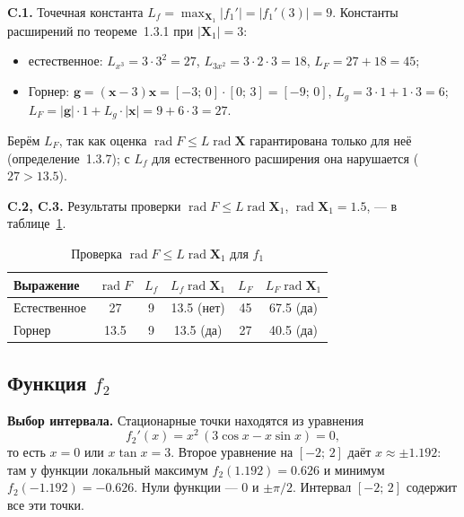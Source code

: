 \documentclass[a4paper, 14pt]{extarticle}
\begin{document}
\textbf{C.1.} Точечная константа $L_f = \max_{\mathbf{X}_1}|f_1'| = |f_1'(3)| = 9$. Константы расширений по теореме~1.3.1 при $|\mathbf{X}_1| = 3$:
\begin{itemize}
    \item естественное: $L_{x^3} = 3\cdot3^2 = 27$, $L_{3x^2} = 3\cdot2\cdot3 = 18$, $L_F = 27 + 18 = 45$;
    \item Горнер: $\mathbf{g} = (\mathbf{x} - 3)\mathbf{x} = [-3;\,0]\cdot[0;\,3] = [-9;\,0]$, $L_g = 3\cdot1 + 1\cdot3 = 6$; $L_F = |\mathbf{g}|\cdot1 + L_g\cdot|\mathbf{x}| = 9 + 6\cdot3 = 27$.
\end{itemize}

Берём $L_F$, так как оценка $\operatorname{rad}F \le L\operatorname{rad}\mathbf{X}$ гарантирована только для неё (определение~1.3.7); с $L_f$ для естественного расширения она нарушается ($27 > 13.5$).

\textbf{C.2, C.3.} Результаты проверки $\operatorname{rad}F \le L\operatorname{rad}\mathbf{X}_1$, $\operatorname{rad}\mathbf{X}_1 = 1.5$, --- в таблице~\ref{tab:f1lip}.

\begin{table}[H]
    \centering
    \caption{Проверка $\operatorname{rad}F \le L\operatorname{rad}\mathbf{X}_1$ для $f_1$}
    \label{tab:f1lip}
    \small
    \begin{tabular}{|l|c|c|c|c|c|}
        \hline
        Выражение & $\operatorname{rad}F$ & $L_f$ & $L_f\operatorname{rad}\mathbf{X}_1$ & $L_F$ & $L_F\operatorname{rad}\mathbf{X}_1$ \\ \hline
        Естественное & 27 & 9 & 13.5 (нет) & 45 & 67.5 (да) \\ \hline
        Горнер & 13.5 & 9 & 13.5 (да) & 27 & 40.5 (да) \\ \hline
    \end{tabular}
\end{table}

\subsection{Функция $f_2$}

\textbf{Выбор интервала.} Стационарные точки находятся из уравнения
\begin{equation*}
    f_2'(x) = x^2\,(3\cos x - x\sin x) = 0,
\end{equation*}
то есть $x = 0$ или $x\tan x = 3$. Второе уравнение на $[-2;\,2]$ даёт $x \approx \pm1.192$: там у функции локальный максимум $f_2(1.192) = 0.626$ и минимум $f_2(-1.192) = -0.626$. Нули функции --- $0$ и $\pm\pi/2$. Интервал $[-2;\,2]$ содержит все эти точки.
\end{document}
